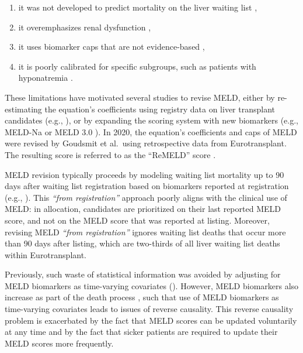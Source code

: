 \documentclass[11pt,twoside,]{book}
\begin{document}
\begin{enumerate}
\def\labelenumi{\arabic{enumi}.}
\item
  it was not developed to predict mortality on the liver waiting list \citep{malinchocModelPredictPoor2000},
\item
  it overemphasizes renal dysfunction
  \citep{sharmaReweightingModelEndStage2008},
\item
  it uses biomarker caps that are not evidence-based
  \citep{leiseRevisedModelEndstage2011},
\item
  it is poorly calibrated for specific subgroups, such as
  patients with hyponatremia \citep{kimHyponatremiaMortalityPatients2008a}.
\end{enumerate}

These limitations have motivated several studies to revise MELD, either
by re-estimating the equation's coefficients using registry data on
liver transplant candidates (e.g., \citep{sharmaReweightingModelEndStage2008, leiseRevisedModelEndstage2011}), or by expanding the scoring system
with new biomarkers (e.g., MELD-Na
\citep{kimHyponatremiaMortalityPatients2008a} or MELD 3.0
\citep{kimMELD3point0}). In 2020, the equation's coefficients and caps of MELD
were revised by Goudsmit et al.~using retrospective data from Eurotransplant.
The resulting score is referred to as the ``ReMELD'' score \citep{goudsmitRefittingModelEndstage2020}.

MELD revision typically proceeds by modeling waiting list mortality up to
90 days after waiting list registration based on biomarkers reported at
registration (e.g., \citep{leiseRevisedModelEndstage2011, kimHyponatremiaMortalityPatients2008a, kimMELD3point0, goudsmitRefittingModelEndstage2020}). This \emph{``from registration''} approach
poorly aligns with the clinical use of MELD: in allocation, candidates are prioritized
on their last reported MELD score, and not on the MELD score that was reported at listing. Moreover, revising MELD \emph{``from registration''} ignores
waiting list deaths that occur more than 90 days after listing, which are
two-thirds of all liver waiting list deaths within Eurotransplant.

Previously, such waste of statistical information was avoided by
adjusting for MELD biomarkers as time-varying covariates
(\citep{sharmaReweightingModelEndStage2008, merionLongitudinalAssessmentMortality2003}).
However, MELD biomarkers also increase as part of the death process
\citep{bambhaPredictingSurvivalPatients2004}, such that use of
MELD biomarkers as time-varying covariates leads to issues of reverse
causality. This reverse causality problem is exacerbated by the fact that MELD scores can be updated voluntarily at any time and by the fact that sicker patients are required
to update their MELD scores more frequently.
\end{document}
